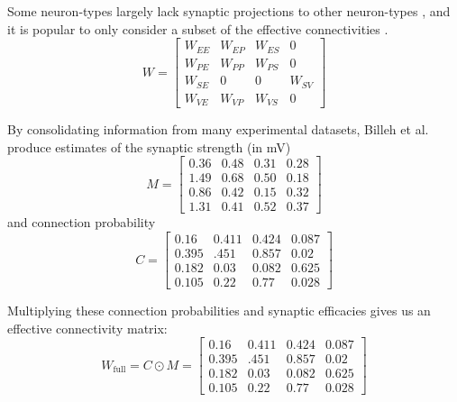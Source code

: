 \documentclass[11pt]{article}
\begin{document}
Some neuron-types largely lack synaptic projections to other neuron-types \cite{pfeffer2013inhibition}, and it is popular to only consider a subset of the effective connectivities \cite{litwin2016inhibitory}.
\begin{equation}
W = \begin{bmatrix} W_{EE} & W_{EP} & W_{ES} & 0 \\
                                W_{PE} & W_{PP} & W_{PS} & 0 \\
                                W_{SE} & 0 & 0 & W_{SV} \\
                                W_{VE} & W_{VP} &  W_{VS} &  0 \end{bmatrix}
\end{equation}

By consolidating information from many experimental datasets, Billeh et al. \cite{billeh2019systematic} produce estimates of the synaptic strength (in mV)
\begin{equation}
M = \begin{bmatrix} 0.36 & 0.48 & 0.31 & 0.28 \\
1.49 & 0.68 & 0.50 & 0.18 \\
0.86 & 0.42 & 0.15 & 0.32 \\
1.31 & 0.41 & 0.52 & 0.37 \end{bmatrix}
\end{equation}
and connection probability
\begin{equation}
C = \begin{bmatrix} 0.16 & 0.411 & 0.424 &  0.087 \\
0.395 & .451 & 0.857 & 0.02 \\
0.182 & 0.03 & 0.082 & 0.625 \\
0.105 & 0.22 & 0.77 & 0.028 \end{bmatrix}
\end{equation}

Multiplying these connection probabilities and synaptic efficacies gives us an effective connectivity matrix:
\begin{equation}
W_{\text{full}} = C \odot M = \begin{bmatrix} 0.16 & 0.411 & 0.424 &  0.087 \\
0.395 & .451 & 0.857 & 0.02 \\
0.182 & 0.03 & 0.082 & 0.625 \\
0.105 & 0.22 & 0.77 & 0.028 \end{bmatrix}
\end{equation}
\end{document}
